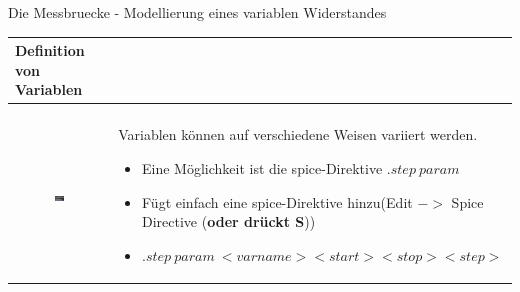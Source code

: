 \begin{frame}[t]{Die Messbruecke - Modellierung eines variablen Widerstandes}
  \begin{spacing}{0.9} \begin{tiny}
      \begin{table}[h!]
        \begin{tabular}{p{3cm} p{7cm}}
          \hline
          \textbf{Definition von Variablen} \\
          \hline                            \\
          \begin{minipage}{.3\textwidth}
            \begin{figure}
              \centering
              \includegraphics[width=0.9\linewidth]{pictures/step_param.png}
            \end{figure}
          \end{minipage}
           &
          \begin{minipage}{.7\textwidth}
            Variablen können auf verschiedene Weisen variiert werden.\newline
            \begin{itemize}
              \item Eine Möglichkeit ist die spice-Direktive $.step\ param$
              \item Fügt einfach eine spice-Direktive hinzu\newline (Edit $->$ Spice Directive (\textbf{oder drückt S}))
              \item $.step\ param\ <varname> <start> <stop> <step>$
            \end{itemize}
          \end{minipage}
          \\
        \end{tabular}
        \\
        \begin{tabular}{p{5cm} p{5cm}}

\end{tabular}
\end{table}
\end{tiny}
\end{spacing}
\end{frame}
